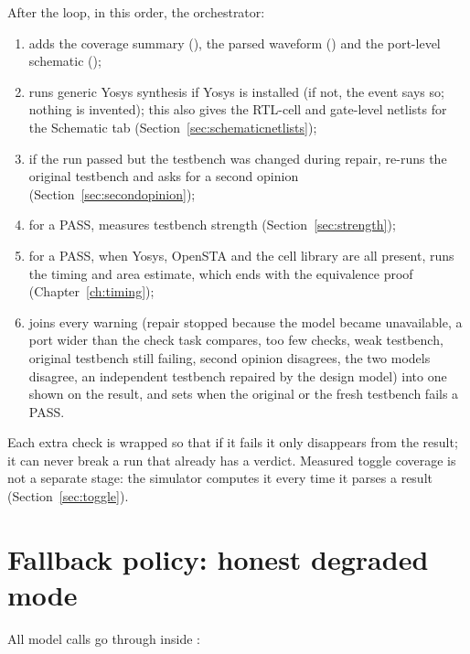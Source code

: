 After the loop, in this order, the orchestrator:
\begin{enumerate}
  \item adds the coverage summary (), the parsed waveform () and the port-level schematic ();
  \item runs generic Yosys synthesis if Yosys is installed (if not, the  event says so; nothing is invented); this also gives the RTL-cell and gate-level netlists for the Schematic tab (Section~\ref{sec:schematicnetlists});
  \item if the run passed but the testbench was changed during repair, re-runs the original testbench and asks for a second opinion (Section~\ref{sec:secondopinion});
  \item for a PASS, measures testbench strength (Section~\ref{sec:strength});
  \item for a PASS, when Yosys, OpenSTA and the cell library are all present, runs the timing and area estimate, which ends with the equivalence proof (Chapter~\ref{ch:timing});
  \item joins every warning (repair stopped because the model became unavailable, a port wider than the check task compares, too few checks, weak testbench, original testbench still failing, second opinion disagrees, the two models disagree, an independent testbench repaired by the design model) into one  shown on the result, and sets  when the original or the fresh testbench fails a PASS.
\end{enumerate}
Each extra check is wrapped so that if it fails it only disappears from the result; it can never break a run that already has a verdict. Measured toggle coverage is not a separate stage: the simulator computes it every time it parses a result (Section~\ref{sec:toggle}).

\section{Fallback policy: honest degraded mode}
\label{sec:fallback}

All model calls go through  inside :

